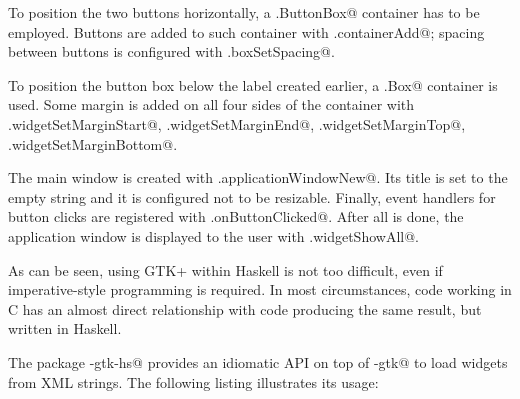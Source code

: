 \documentclass[UdineBachThesis,american,11pt]{PhdThesis}
\begin{document}
  To position the two buttons horizontally, a \lstinline@Gtk.ButtonBox@
  container has to be employed. Buttons are added to such container with
  \lstinline@Gtk.containerAdd@; spacing between buttons is configured with
  \lstinline@Gtk.boxSetSpacing@.

  To position the button box below the label created earlier, a
  \lstinline@Gtk.Box@ container is used. Some margin is added on all four sides
  of the container with \lstinline@Gtk.widgetSetMarginStart@,
  \lstinline@Gtk.widgetSetMarginEnd@, \lstinline@Gtk.widgetSetMarginTop@,
  \lstinline@Gtk.widgetSetMarginBottom@.

  The main window is created with \lstinline@Gtk.applicationWindowNew@. Its
  title is set to the empty string and it is configured not to be resizable.
  Finally, event handlers for button clicks are registered with
  \lstinline@Gtk.onButtonClicked@. After all is done, the application window is
  displayed to the user with \lstinline@Gtk.widgetShowAll@.

  As can be seen, using GTK+ within Haskell is not too difficult, even if
  imperative-style programming is required. In most circumstances, code working
  in C has an almost direct relationship with code producing the same result,
  but written in Haskell.

  The package \lstinline@gi-gtk-hs@ provides an idiomatic API on top of
  \lstinline@gi-gtk@ to load widgets from XML strings. The following listing
  illustrates its usage:
\end{document}
